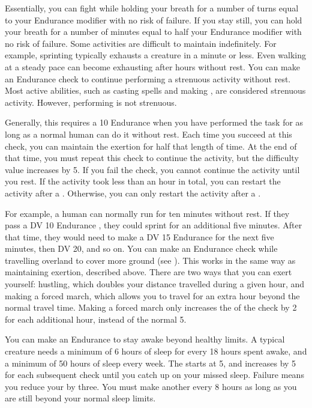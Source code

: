     Essentially, you can fight while holding your breath for a number of turns equal to your Endurance modifier with no risk of failure.
    If you stay still, you can hold your breath for a number of minutes equal to half your Endurance modifier with no risk of failure.
    Some activities are difficult to maintain indefinitely.
    For example, sprinting typically exhausts a creature in a minute or less.
    Even walking at a steady pace can become exhausting after hours without rest.
    You can make an Endurance check to continue performing a strenuous activity without rest.
    Most active abilities, such as casting spells and making , are considered strenuous activity.
    However, performing  is not strenuous.

    Generally, this requires a  10 Endurance  when you have performed the task for as long as a normal human can do it without rest.
    Each time you succeed at this check, you can maintain the exertion for half that length of time.
    At the end of that time, you must repeat this check to continue the activity, but the difficulty value increases by 5.
    If you fail the check, you cannot continue the activity until you rest.
    If the activity took less than an hour in total, you can restart the activity after a .
    Otherwise, you can only restart the activity after a .

    For example, a human can normally run for ten minutes without rest.
    If they pass a DV 10 Endurance , they could sprint for an additional five minutes.
    After that time, they would need to make a DV 15 Endurance  for the next five minutes, then DV 20, and so on.
     You can make an Endurance check while travelling overland to cover more ground (see ).
    This works in the same way as maintaining exertion, described above.
    There are two ways that you can exert yourself: hustling, which doubles your distance travelled during a given hour, and making a forced march, which allows you to travel for an extra hour beyond the normal travel time.
    Making a forced march only increases the  of the check by 2 for each additional hour, instead of the normal 5.

     You can make an Endurance  to stay awake beyond healthy limits.
    A typical creature needs a minimum of 6 hours of sleep for every 18 hours spent awake, and a minimum of 50 hours of sleep every week.
    The  starts at 5, and increases by 5 for each subsequent check until you catch up on your missed sleep.
    Failure means you reduce your  by three.
    You must make another  every 8 hours as long as you are still beyond your normal sleep limits.

